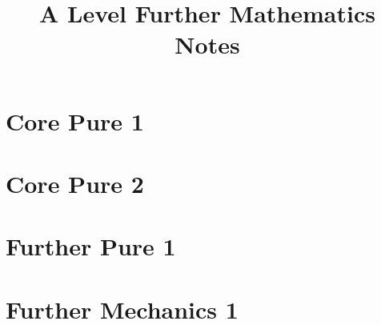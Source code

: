 \documentclass[oneside,fleqn,11pt]{book}
\title{A Level Further Mathematics Notes}
\begin{document}
\everymath{\displaystyle}
\maketitle
\tableofcontents

\part{Core Pure 1}


\part{Core Pure 2}
\setcounter{chapter}{0}


\part{Further Pure 1}
\setcounter{chapter}{0}


\part{Further Mechanics 1}
\setcounter{chapter}{0}

\end{document}
